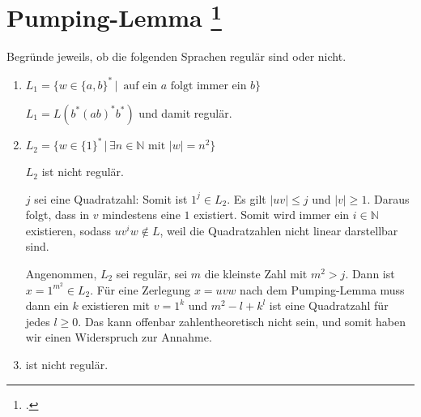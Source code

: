 \documentclass{lehramt-informatik-aufgabe}
\begin{document}
\section{Pumping-Lemma
\footcite{theo:ab:1}}

Begründe jeweils, ob die folgenden Sprachen regulär sind oder nicht.

\begin{enumerate}


\item $L_1 = \{w \in \{a, b\}^* \,|\, \text{ auf ein } a \text{ folgt
immer ein } b\}$

\begin{liAntwort}
$L_1 = L(b^* (ab)^* b^*)$ und damit regulär.
\end{liAntwort}


\item $L_2 = \{ w \in \{ 1 \}^* \,|\, \exists n \in \mathbb{N} \text{ mit }
|w| = n^2\}$

\begin{liAntwort}
$L_2$ ist nicht regulär.


$j$ sei eine Quadratzahl: Somit ist $1^j \in L_2$. Es gilt $|uv| \leq j$
und $|v| \geq 1$. Daraus folgt, dass in $v$ mindestens eine $1$
existiert. Somit wird immer ein $i \in \mathbb{N}$ existieren, sodass
$uv^iw \notin L$, weil die Quadratzahlen nicht linear darstellbar sind.


Angenommen, $L_2$ sei regulär, sei $m$ die kleinste Zahl mit $m^2 > j$.
Dann ist $x = 1^{m^2} \in L_2$. Für eine Zerlegung $x = uvw$ nach dem
Pumping-Lemma muss dann ein $k$ existieren mit $v = 1^k$ und $m^2 - l +
k^l$ ist eine Quadratzahl für jedes $l \geq 0$. Das kann offenbar
zahlentheoretisch nicht sein, und somit haben wir einen Widerspruch zur
Annahme.
\end{liAntwort}


\item {}

\begin{liAntwort}
 ist nicht regulär.


\end{liAntwort}
\end{enumerate}
\end{document}
